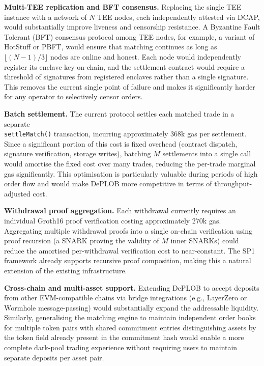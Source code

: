 \documentclass[12pt,a4paper]{article}
\begin{document}
\textbf{Multi-TEE replication and BFT consensus.} Replacing the single TEE instance with a network of $N$ TEE nodes, each independently attested via DCAP, would substantially improve liveness and censorship resistance. A Byzantine Fault Tolerant (BFT) consensus protocol among TEE nodes, for example, a variant of HotStuff or PBFT, would ensure that matching continues as long as $\lfloor(N-1)/3\rfloor$ nodes are online and honest. Each node would independently register its enclave key on-chain, and the settlement contract would require a threshold of signatures from registered enclaves rather than a single signature. This removes the current single point of failure and makes it significantly harder for any operator to selectively censor orders.

\textbf{Batch settlement.} The current protocol settles each matched trade in a separate \\ \texttt{settleMatch()} transaction, incurring approximately 368k gas per settlement. Since a significant portion of this cost is fixed overhead (contract dispatch, signature verification, storage writes), batching $M$ settlements into a single call would amortise the fixed cost over many trades, reducing the per-trade marginal gas significantly. This optimisation is particularly valuable during periods of high order flow and would make DePLOB more competitive in terms of throughput-adjusted cost.

\textbf{Withdrawal proof aggregation.} Each withdrawal currently requires an individual Groth16 proof verification costing approximately 270k gas. Aggregating multiple withdrawal proofs into a single on-chain verification using proof recursion (a SNARK proving the validity of $M$ inner SNARKs) could reduce the amortised per-withdrawal verification cost to near-constant. The SP1 framework already supports recursive proof composition, making this a natural extension of the existing infrastructure.

\textbf{Cross-chain and multi-asset support.} Extending DePLOB to accept deposits from other EVM-compatible chains via bridge integrations (e.g., LayerZero or Wormhole message-passing) would substantially expand the addressable liquidity. Similarly, generalising the matching engine to maintain independent order books for multiple token pairs with shared commitment entries distinguishing assets by the token field already present in the commitment hash would enable a more complete dark-pool trading experience without requiring users to maintain separate deposits per asset pair.
\end{document}
